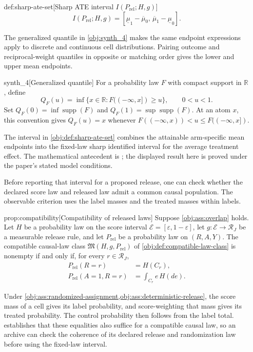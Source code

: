 \begin{definitionv}{def:sharp-ate-set}[Sharp ATE interval $I(P_{\mathrm{rel}};H,g)$]
\[
I(P_{\mathrm{rel}};H,g)
=
[\underline\mu_1-\overline\mu_0,\,
 \overline\mu_1-\underline\mu_0].
\]
\end{definitionv}

The generalized quantile  in \cref{obj:synth_4} makes the same endpoint expressions apply to discrete and continuous cell distributions. Pairing outcome and reciprocal-weight quantiles in opposite or matching order gives the lower and upper mean endpoints.

\begin{definitionv}{synth_4}[Generalized quantile]
For a probability law \(F\) with compact support in \(\mathbb R\), define
\[
Q_F(u)=\inf\{x\in\mathbb R:F((-\infty,x])\ge u\},\qquad 0<u<1.
\]
Set \(Q_F(0)=\inf\operatorname{supp}(F)\) and \(Q_F(1)=\sup\operatorname{supp}(F)\). At an atom \(x\), this convention gives \(Q_F(u)=x\) whenever \(F((-\infty,x))<u\le F((-\infty,x])\).
\end{definitionv}

The interval  in \cref{obj:def:sharp-ate-set} combines the attainable arm-specific mean endpoints into the fixed-law sharp identified interval for the average treatment effect. The mathematical antecedent is \citet[Theorem 3.2 and eq. (3.1)]{FanShermanShum2014}; the displayed result here is proved under the paper's stated model conditions.

Before reporting that interval for a proposed release, one can check whether the declared score law and released law admit a common causal population. The observable criterion uses the label masses and the treated masses within labels.

\begin{theoremv}{prop:compatibility}[Compatibility of released laws]
Suppose \cref{obj:ass:overlap} holds. Let \(H\) be a probability law on the score interval \(\mathcal E=[\varepsilon,1-\varepsilon]\), let \(g:\mathcal E\to\mathcal R_J\) be a measurable release rule, and let \(P_{\mathrm{rel}}\) be a probability law on \((R,A,Y)\). The compatible causal-law class \(\mathfrak M(H,g,P_{\mathrm{rel}})\) of \cref{obj:def:compatible-law-class} is nonempty if and only if, for every \(r\in\mathcal R_J\),
\[
\begin{aligned}
P_{\mathrm{rel}}(R=r) &= H(C_r),\\
P_{\mathrm{rel}}(A=1,R=r) &= \int_{C_r} e\,H(de).
\end{aligned}
\]
\end{theoremv}

Under \cref{obj:ass:randomized-assignment,obj:ass:deterministic-release}, the score mass of a cell gives its label probability, and score-weighting that mass gives its treated probability. The control probability then follows from the label total.  establishes that these equalities also suffice for a compatible causal law, so an archive can check the coherence of its declared release and randomization law before using the fixed-law interval.
